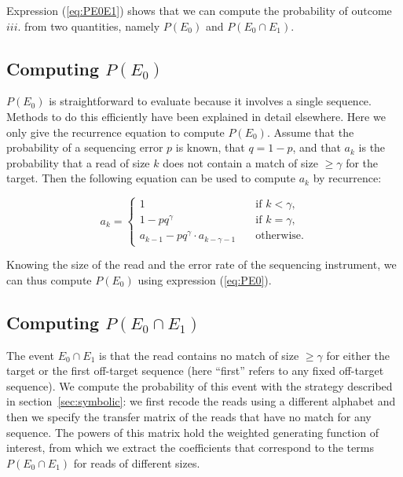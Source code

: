 \documentclass{article}
\begin{document}
Expression (\ref{eq:PE0E1}) shows that we can compute the probability of
outcome $iii.$ from two quantities, namely $P(E_0)$ and $P(E_0 \cap E_1)$.

\subsection{Computing $P(E_0)$}
\label{sec:cPE0}

$P(E_0)$ is straightforward to evaluate because it involves a single
sequence. Methods to do this efficiently have been explained in detail
elsewhere\cite{filion2018analytic}. Here we only give the recurrence
equation to compute $P(E_0)$. Assume that the probability of a sequencing
error $p$ is known, that $q = 1-p$, and that $a_k$ is the probability that
a read of size $k$ does not contain a match of size $\geq \gamma$ for the
target. Then the following equation can be used to compute $a_k$ by
recurrence:

\begin{equation}
\label{eq:PE0}
a_k = 
\begin{cases}
1            &\quad\text{if } k < \gamma, \\
1 -pq^\gamma &\quad\text{if } k = \gamma, \\
a_{k-1} -pq^\gamma \cdot a_{k-\gamma-1} &\quad\text{otherwise.}
\end{cases}
\end{equation}

Knowing the size of the read and the error rate of the sequencing
instrument, we can thus compute $P(E_0)$ using expression (\ref{eq:PE0}).

\subsection{Computing $P(E_0 \cap E_1)$}
\label{sec:cPE0E1}

The event $E_0 \cap E_1$ is that the read contains no match of size $\geq
\gamma$ for either the target or the first off-target sequence (here
``first'' refers to any fixed off-target sequence). We compute the
probability of this event with the strategy described in
section~\ref{sec:symbolic}: we first recode the reads using a different
alphabet and then we specify the transfer matrix of the reads that have no
match for any sequence. The powers of this matrix hold the weighted
generating function of interest, from which we extract the coefficients
that correspond to the terms $P(E_0 \cap E_1)$ for reads of different
sizes.
\end{document}
